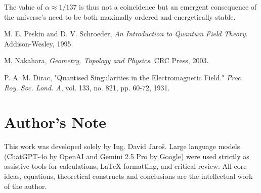 \documentclass[12pt, a4paper]{article}
\begin{document}
The value of \( \alpha \approx 1/137 \) is thus not a coincidence but an emergent consequence of the universe's need to be both maximally ordered and energetically stable.

\begin{thebibliography}{9}

M. E. Peskin and D. V. Schroeder,
\textit{An Introduction to Quantum Field Theory}.
Addison-Wesley, 1995.

M. Nakahara,
\textit{Geometry, Topology and Physics}.
CRC Press, 2003.

P. A. M. Dirac,
"Quantised Singularities in the Electromagnetic Field."
\textit{Proc. Roy. Soc. Lond. A}, vol. 133, no. 821, pp. 60-72, 1931.

\end{thebibliography}


\section*{Author's Note}

This work was developed solely by Ing. David Jaroš.  
Large language models (ChatGPT-4o by OpenAI and Gemini 2.5 Pro by Google) were used strictly as assistive tools for calculations, LaTeX formatting, and critical review.  
All core ideas, equations, theoretical constructs and conclusions are the intellectual work of the author.
\end{document}
